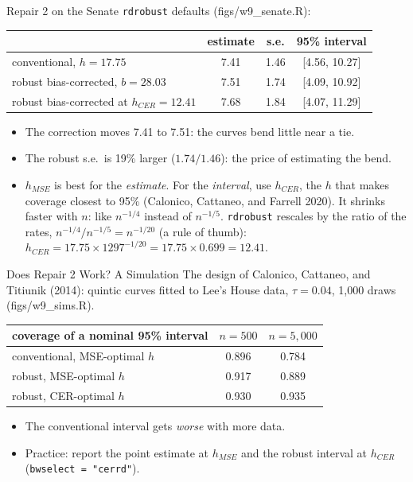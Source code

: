 \documentclass[aspectratio=169,11pt,xcolor=dvipsnames]{beamer}
\newcommand{\srcp}[1]{{\scriptsize\color{gray}(#1)}}
\newcommand{\srct}[1]{#1}
\begin{document}
\begin{frame}{Repair 2 on the Senate}
\texttt{rdrobust} defaults \srcp{figs/w9\_senate.R}:
\vskip3pt
\begin{center}\small
\renewcommand{\arraystretch}{1.1}
\begin{tabular}{@{}lccc@{}}
\toprule
& estimate & s.e. & 95\% interval \\
\midrule
conventional, $h = 17.75$ & 7.41 & 1.46 & [4.56, 10.27] \\
\alert{robust bias-corrected}, $b = 28.03$ & 7.51 & 1.74 & \alert{[4.09, 10.92]} \\
\midrule
robust bias-corrected at $h_{CER} = 12.41$ & 7.68 & 1.84 & [4.07, 11.29] \\
\bottomrule
\end{tabular}
\end{center}
\vskip0pt
\begin{itemize}\itemsep2pt
  \item The correction moves 7.41 to 7.51: the curves bend little near a tie.
  \item The robust s.e.\ is 19\% larger ($1.74/1.46$): the price of estimating the bend.
  \item $h_{MSE}$ is best for the \emph{estimate}. For the \emph{interval}, use
        \textbf{$h_{CER}$}, the $h$ that makes coverage closest to 95\%
        \srcp{Calonico, Cattaneo, and Farrell 2020}. It shrinks faster with $n$:
        like $n^{-1/4}$ instead of $n^{-1/5}$. \texttt{rdrobust} rescales by the ratio
        of the rates, $n^{-1/4}/n^{-1/5} = n^{-1/20}$ (a rule of thumb):
        $h_{CER} = 17.75 \times 1297^{-1/20} = 17.75 \times 0.699 = 12.41$.
\end{itemize}
\end{frame}

\begin{frame}{Does Repair 2 Work? A Simulation}
The design of \srct{Calonico, Cattaneo, and Titiunik (2014)}: quintic curves
fitted to Lee's House data, $\tau = 0.04$, 1,000 draws \srcp{figs/w9\_sims.R}.
\vskip4pt
\begin{center}\small
\renewcommand{\arraystretch}{1.0}
\begin{tabular}{@{}lcc@{}}
\toprule
coverage of a nominal 95\% interval & $n = 500$ & $n = 5{,}000$ \\
\midrule
conventional, MSE-optimal $h$ & 0.896 & 0.784 \\
robust, MSE-optimal $h$ & 0.917 & 0.889 \\
robust, CER-optimal $h$ & 0.930 & 0.935 \\
\bottomrule
\end{tabular}
\end{center}
\vskip3pt
\begin{itemize}\itemsep2pt
  \item The conventional interval gets \emph{worse} with more data.
  \item Practice: report the point estimate at $h_{MSE}$ and the robust interval
        at $h_{CER}$ (\texttt{bwselect = "cerrd"}).
\end{itemize}
\end{frame}
\end{document}
